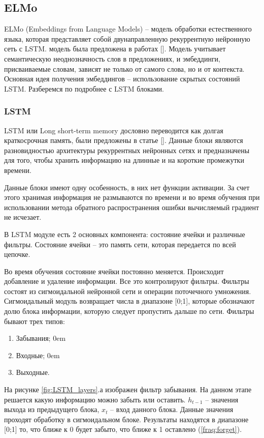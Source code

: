 \documentclass[a4paper,14pt]{article}
\begin{document}
\subsection{ELMo}

ELMo (Embeddings from Language Models) -- модель обработки естественного языка, которая представляет собой двунаправленную рекуррентную нейронную сеть с LSTM.
модель была предложена в работах [].
Модель учитывает семантическую неоднозначность слов в предложениях, и эмбеддинги, присваиваемые словам, зависят не только от самого слова, но и от контекста.
Основная идея получения эмбеддингов -- использование скрытых состояний LSTM.
Разберемся по подробнее с LSTM блоками.

\subsubsection{LSTM}

LSTM или Long short-term memory дословно переводится как долгая краткосрочная память, были предложены в статье [].
Данные блоки являются разновидностью архитектуры рекуррентных нейронных сетях и предназначены для того, чтобы хранить информацию на длинные и на короткие промежутки времени.

Данные блоки имеют одну особенность, в них нет функции активации.
За счет этого хранимая информация не размываются по времени и во время обучения при использовании метода обратного распространения ошибки вычисляемый градиент не исчезает.

В LSTM модуле есть 2 основных компонента: состояние ячейки и различные фильтры.
Состояние ячейки -- это память сети, которая передается по всей цепочке.

Во время обучения состояние ячейки постоянно меняется. Происходит добавление и удаление информации.
Все это контролируют фильтры.
Фильтры состоят из сигмоидальной нейронной сети и операции поточечного умножения.
Сигмоидальный модуль возвращает числа в диапазоне [0;1], которые обозначают долю блока информации, которую следует пропустить дальше по сети.
Фильтры бывают трех типов:
\begin{enumerate}
	\itemsep0em 
	\item Забывания;
	\itemsep0em 
	\item Входные;
	\itemsep0em 
	\item Выходные.
\end{enumerate}

На рисунке \ref{fig:LSTM_layers}.а изображен фильтр забывания.
На данном этапе решается какую информацию можно забыть или оставить.
$h_{t-1}$ -- значения выхода из предыдущего блока, $x_t$ -- вход данного блока.
Данные значения проходят обработку в сигмоидальном блоке.
Результаты находятся в диапазоне [0;1] то, что ближе к 0 будет забыто, что ближе к 1 оставлено (\ref{fraq:forget}).
\end{document}
